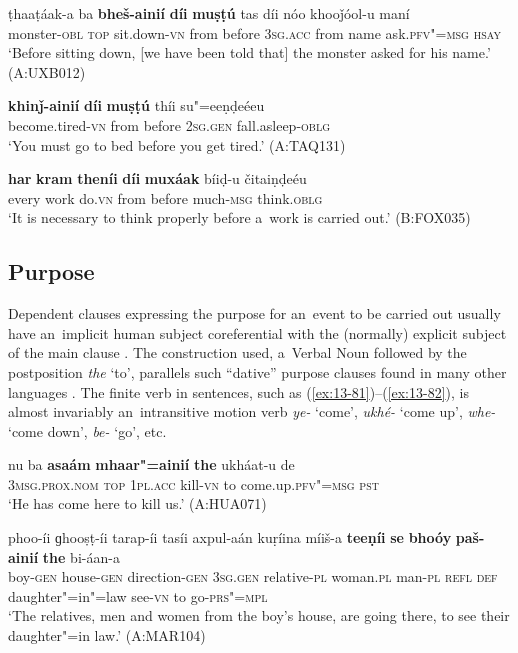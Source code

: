 \begin{exe}
\ex
\label{ex:13-78}
\gll ṭhaaṭáak-a ba \textbf{bheš-ainií} \textbf{díi} \textbf{muṣṭú} tas díi nóo khooǰóol-u maní \\
monster-\textsc{obl} \textsc{top} sit.down-\textsc{vn} from before \textsc{3sg.acc} from name ask.\textsc{pfv"=msg} \textsc{hsay} \\
\glt `Before sitting down, [we have been told that] the monster asked for his name.' (A:UXB012)

\ex
\label{ex:13-79}
\gll \textbf{khinǰ-ainií} \textbf{díi} \textbf{muṣṭú} thíi su"=eeṇḍeéeu  \\
become.tired-\textsc{vn} from before \textsc{2sg.gen} fall.asleep-\textsc{oblg} \\
\glt `You must go to bed before you get tired.' (A:TAQ131)

\ex
\label{ex:13-80}
\gll \textbf{har} \textbf{kram} \textbf{theníi} \textbf{díi} \textbf{muxáak} bíiḍ-u čitaiṇḍeéu  \\
every work do.\textsc{vn} from before much-\textsc{msg} think.\textsc{oblg} \\
\glt `It is necessary to think properly before a~work is carried out.' (B:FOX035)
\end{exe}

\subsection{Purpose}
\label{subsec:13-4-2}

Dependent clauses expressing the purpose for an~event to be carried out usually have an~implicit human subject coreferential with the (normally) explicit subject of the main clause \citep[337]{givon2001b}. The construction used, a~Verbal Noun followed by the postposition \textit{the} `to', parallels such ``dative'' purpose clauses found in many other languages \citep[251--252]{thompsonetal2007}. The finite verb in sentences, such as (\ref{ex:13-81})--(\ref{ex:13-82}), is almost invariably an~intransitive motion verb \textit{ye-} `come', \textit{ukhé-} `come up', \textit{whe-} `come down', \textit{be-} `go', etc.

\begin{exe}
\ex
\label{ex:13-81}
\gll nu ba \textbf{asaám} \textbf{mhaar"=ainií} \textbf{the} ukháat-u de\\
\textsc{3msg.prox.nom} \textsc{top} \textsc{1pl.acc} kill-\textsc{vn} to come.up.\textsc{pfv"=msg} \textsc{pst}\\
\glt `He has come here to kill us.' (A:HUA071)

\ex
\label{ex:13-82}
\gll phoo-íi ɡhooṣṭ-íi tarap-íi tasíi axpul-aán kuṛíina míiš-a \textbf{teeṇíi} \textbf{se} \textbf{bhoóy} \textbf{paš-ainií} \textbf{the} bi-áan-a \\
boy-\textsc{gen} house-\textsc{gen} direction-\textsc{gen} \textsc{3sg.gen} relative-\textsc{pl} woman.\textsc{pl}  man-\textsc{pl} \textsc{refl} \textsc{def} daughter"=in"=law see-\textsc{vn} to go-\textsc{prs"=mpl} \\
\glt `The relatives, men and women from the boy's house, are going there, to see their daughter"=in law.' (A:MAR104) 
\end{exe}

